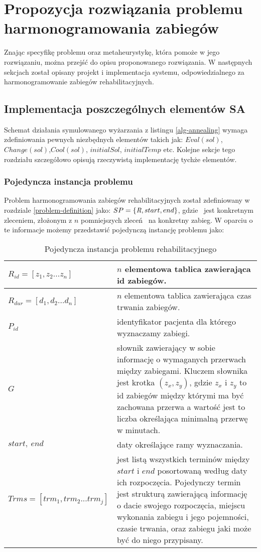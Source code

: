 \chapter{Propozycja rozwiązania problemu harmonogramowania zabiegów}
\label{solution}
Znając specyfikę problemu oraz metaheurystykę, która pomoże w jego rozwiązaniu,
można przejść do opisu proponowanego rozwiązania. W następnych sekcjach został
opisany projekt i implementacja systemu, odpowiedzialnego za harmonogramowanie zabiegów rehabilitacyjnych.

\section{Implementacja poszczególnych elementów SA}
Schemat działania symulowanego wyżarzania z listingu \ref{alg-annealing} wymaga
zdefiniowania pewnych niezbędnych elementów takich jak: $Eval(sol)$,
$Change(sol)$,$Cool(sol)$, $initialSol$, $initialTemp$ etc. Kolejne sekcje tego rozdziału
szczegółowo opisują rzeczywistą implementację tychże elementów. 
\pagebreak
\subsection{Pojedyncza instancja problemu}
Problem harmonogramowania zabiegów rehabilitacyjnych został zdefiniowany w
rozdziale \ref{problem-definition} jako: $SP=\{\emph{R},start,end\}$, gdzie \sRef\ jest
konkretnym zleceniem, złożonym z $n$ pomniejszych zleceń \sSubRef\ na konkretny zabieg. W oparciu o te informacje możemy przedstawić pojedynczą instancję problemu jako:
\begin{table}[h]
	\centering
	\begin{tabular}{ | m{} | m{} | }
	\hline
	$R_{id}=[z_1,z_2...z_n]$ & $n$ elementowa tablica zawierająca id zabiegów. \\
	\hline
	$R_{dur}=[d_1,d_2...d_n]$ & $n$ elementowa tablica zawierająca czas trwania zabiegów. \\
	\hline
	$P_{id}$ & identyfikator pacjenta dla którego wyznaczamy zabiegi. \\
	\hline
	$G$ & słownik zawierający w sobie informację o wymaganych przerwach
	między zabiegami. Kluczem słownika jest krotka $(z_x,z_y)$, gdzie $z_x$
	i $z_y$ to id zabiegów między którymi ma być zachowana przerwa a
	wartość jest to liczba określająca minimalną przerwę w minutach. \\
	\hline
	$start,\ end$ & daty określające ramy wyznaczania. \\
	\hline
	$Trms = [trm_1,trm_2...trm_j]$ & jest listą wszystkich terminów między
	$start$ i $end$ posortowaną według daty ich rozpoczęcia.
	Pojedynczy termin jest strukturą zawierającą informację o dacie
	swojego rozpoczęcia, miejscu wykonania zabiegu i jego pojemności, czasie trwania, oraz
	zabiegu jaki może być do niego przypisany.\\
	\hline
\end{tabular}
\caption{Pojedyncza instancja problemu rehabilitacyjnego}
\end{table}
